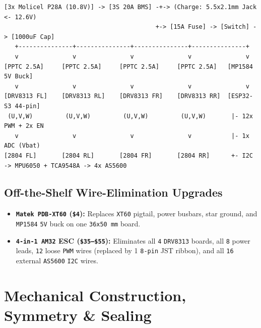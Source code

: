 \documentclass[11pt,a4paper]{article}
\begin{document}
\begin{lstlisting}[caption={Verified Power, Protection, and Control Signal Routing}]
[3x Molicel P28A (10.8V)] -> [3S 20A BMS] -+-> (Charge: 5.5x2.1mm Jack <- 12.6V)
                                          +-> [15A Fuse] -> [Switch] -> [1000uF Cap]
   +---------------+---------------+---------------+---------------+
   v               v               v               v               v
[PPTC 2.5A]     [PPTC 2.5A]     [PPTC 2.5A]     [PPTC 2.5A]   [MP1584 5V Buck]
   v               v               v               v               v
[DRV8313 FL]    [DRV8313 RL]    [DRV8313 FR]    [DRV8313 RR]  [ESP32-S3 44-pin]
 (U,V,W)         (U,V,W)         (U,V,W)         (U,V,W)       |- 12x PWM + 2x EN
   v               v               v               v           |- 1x ADC (Vbat)
[2804 FL]       [2804 RL]       [2804 FR]       [2804 RR]      +- I2C -> MPU6050 + TCA9548A -> 4x AS5600
\end{lstlisting}

\subsection{Off-the-Shelf Wire-Elimination Upgrades}
\begin{itemize}
  \item \textbf{\texttt{Matek PDB-XT60} (\texttt{\$4}):} Replaces \texttt{XT60} pigtail, power busbars, star ground, and \texttt{MP1584} \texttt{5V} buck on one \texttt{36x50 mm} board.
  \item \textbf{\texttt{4-in-1 AM32} ESC (\texttt{\$35–\$55}):} Eliminates all \texttt{4} \texttt{DRV8313} boards, all \texttt{8} power leads, \texttt{12} loose \texttt{PWM} wires (replaced by 1 \texttt{8-pin} JST ribbon), and all \texttt{16} external \texttt{AS5600} \texttt{I2C} wires.
\end{itemize}

\section{Mechanical Construction, Symmetry \& Sealing}
\end{document}
